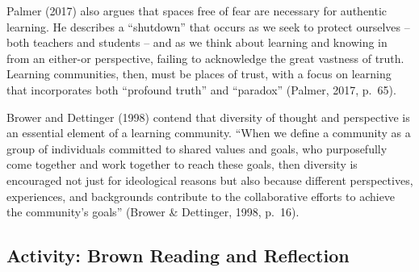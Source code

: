 \documentclass[
]{book}
\begin{document}
Palmer (2017) also argues that spaces free of fear are necessary for authentic learning. He describes a ``shutdown'' that occurs as we seek to protect ourselves -- both teachers and students -- and as we think about learning and knowing in from an either-or perspective, failing to acknowledge the great vastness of truth. Learning communities, then, must be places of trust, with a focus on learning that incorporates both ``profound truth'' and ``paradox'' (Palmer, 2017, p.~65).

Brower and Dettinger (1998) contend that diversity of thought and perspective is an essential element of a learning community. ``When we define a community as a group of individuals committed to shared values and goals, who purposefully come together and work together to reach these goals, then diversity is encouraged not just for ideological reasons but also because different perspectives, experiences, and backgrounds contribute to the collaborative efforts to achieve the community's goals'' (Brower \& Dettinger, 1998, p.~16).

\hypertarget{activity-brown-reading-and-reflection}{%
\subsection{Activity: Brown Reading and Reflection}\label{activity-brown-reading-and-reflection}}
\end{document}
